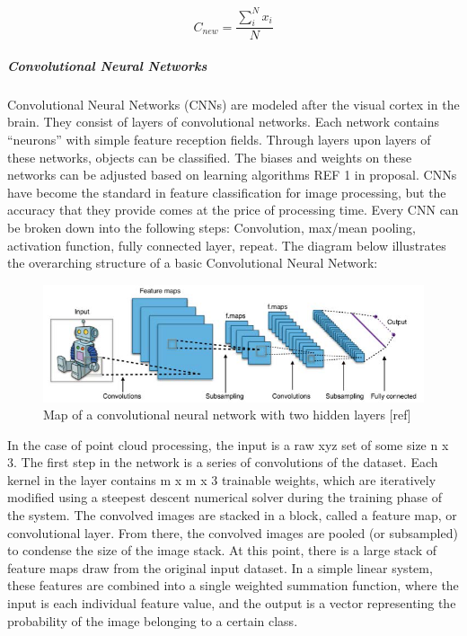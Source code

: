 \documentclass[12pt]{drexelthesis}
\begin{document}
\begin{equation}
	C_{new} = \frac{\sum_{i}^{N}  x_{i}}{N}
\end{equation}

\subparagraph{Convolutional Neural Networks}
Convolutional Neural Networks (CNNs) are modeled after the visual cortex in the brain. They consist of layers of convolutional networks. Each network contains “neurons” with simple feature reception fields. Through layers upon layers of these networks, objects can be classified. The biases and weights on these networks can be adjusted based on learning algorithms REF 1 in proposal. CNNs have become the standard in feature classification for image processing, but the accuracy that they provide comes at the price of processing time. 
Every CNN can be broken down into the following steps: Convolution, max/mean pooling, activation function, fully connected layer, repeat. The diagram below illustrates the overarching structure of a basic Convolutional Neural Network:
\begin{figure}[!ht]
	\centering
		\includegraphics[width=6in]{cnn.png}
	\caption[High level flow chart of a convolutional neural network]{\centering Map of a convolutional neural network with two hidden layers [ref]}
\end{figure}

In the case of point cloud processing, the input is a raw xyz set of some size n x 3. The first step in the network is a series of convolutions of the dataset. Each kernel in the layer contains m x m x 3 trainable weights, which are iteratively modified using a steepest descent numerical solver during the training phase of the system. The convolved images are stacked in a block, called a feature map, or convolutional layer. From there, the convolved images are pooled (or subsampled) to condense the size of the image stack. 
At this point, there is a large stack of feature maps draw from the original input dataset. In a simple linear system, these features are combined into a single weighted summation function, where the input is each individual feature value, and the output is a vector representing the probability of the image belonging to a certain class.
\end{document}
